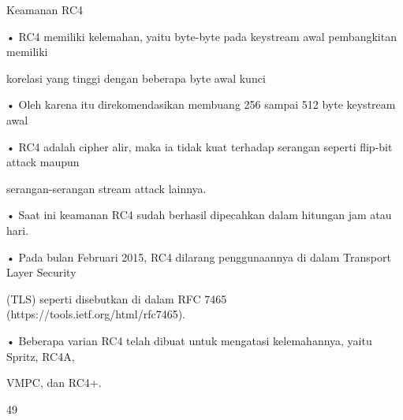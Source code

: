 \documentclass{article}
\begin{document}

Keamanan RC4

• RC4 memiliki kelemahan, yaitu byte-byte pada keystream awal pembangkitan memiliki 

korelasi yang tinggi dengan beberapa byte awal kunci

• Oleh karena itu direkomendasikan membuang 256 sampai 512 byte keystream awal


• RC4 adalah cipher alir, maka ia tidak kuat terhadap serangan seperti flip-bit attack maupun 

serangan-serangan stream attack lainnya. 

• Saat ini keamanan RC4 sudah berhasil dipecahkan dalam hitungan jam atau hari. 

• Pada bulan Februari 2015, RC4 dilarang penggunaannya di dalam Transport Layer Security 

(TLS) seperti disebutkan di dalam RFC 7465 (https://tools.ietf.org/html/rfc7465).

• Beberapa varian RC4 telah dibuat untuk mengatasi kelemahannya, yaitu Spritz, RC4A, 

VMPC, dan RC4+. 

49
\end{document}

